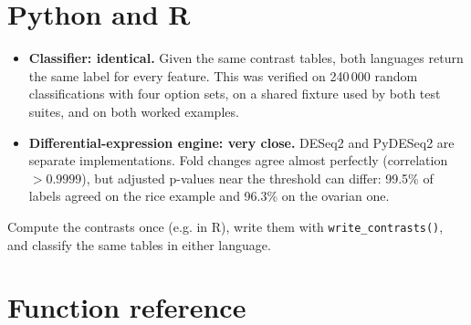 \documentclass[11pt,a4paper]{article}
\newcommand{\code}[1]{\texttt{\color{navy!85!black}#1}}
\begin{document}
\section{Python and R}

\begin{itemize}
  \item \textbf{Classifier: identical.} Given the same contrast tables, both languages return the same
        label for every feature. This was verified on 240\,000 random classifications with four option
        sets, on a shared fixture used by both test suites, and on both worked examples.
  \item \textbf{Differential-expression engine: very close.} DESeq2 and PyDESeq2 are separate
        implementations. Fold changes agree almost perfectly (correlation \(>0.9999\)), but adjusted
        p-values near the threshold can differ: 99.5\% of labels agreed on the rice example and 96.3\% on
        the ovarian one.
\end{itemize}

\begin{tip}
Compute the contrasts once (e.g. in R), write them with \code{write\_contrasts()}, and classify the same
tables in either language.
\end{tip}

\section{Function reference}
\end{document}
